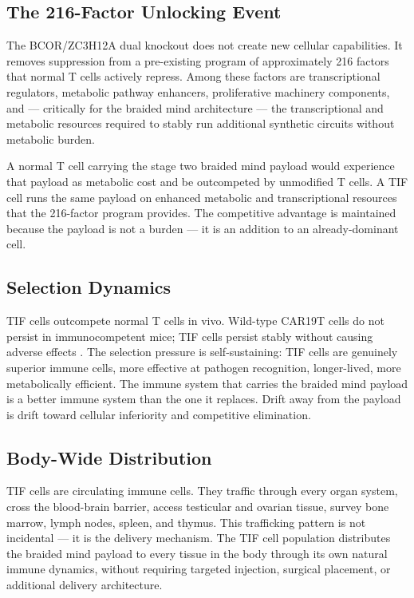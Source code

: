 \documentclass[12pt]{article}
\begin{document}
\subsection{The 216-Factor Unlocking Event}

The BCOR/ZC3H12A dual knockout does not create new cellular capabilities. It removes suppression from a pre-existing program of approximately 216 factors that normal T cells actively repress. Among these factors are transcriptional regulators, metabolic pathway enhancers, proliferative machinery components, and --- critically for the braided mind architecture --- the transcriptional and metabolic resources required to stably run additional synthetic circuits without metabolic burden.

A normal T cell carrying the stage two braided mind payload would experience that payload as metabolic cost and be outcompeted by unmodified T cells. A TIF cell runs the same payload on enhanced metabolic and transcriptional resources that the 216-factor program provides. The competitive advantage is maintained because the payload is not a burden --- it is an addition to an already-dominant cell.

\subsection{Selection Dynamics}

TIF cells outcompete normal T cells in vivo. Wild-type CAR19T cells do not persist in immunocompetent mice; TIF cells persist stably without causing adverse effects \cite{tif_cells_2024}. The selection pressure is self-sustaining: TIF cells are genuinely superior immune cells, more effective at pathogen recognition, longer-lived, more metabolically efficient. The immune system that carries the braided mind payload is a better immune system than the one it replaces. Drift away from the payload is drift toward cellular inferiority and competitive elimination.

\subsection{Body-Wide Distribution}

TIF cells are circulating immune cells. They traffic through every organ system, cross the blood-brain barrier, access testicular and ovarian tissue, survey bone marrow, lymph nodes, spleen, and thymus. This trafficking pattern is not incidental --- it is the delivery mechanism. The TIF cell population distributes the braided mind payload to every tissue in the body through its own natural immune dynamics, without requiring targeted injection, surgical placement, or additional delivery architecture.
\end{document}
